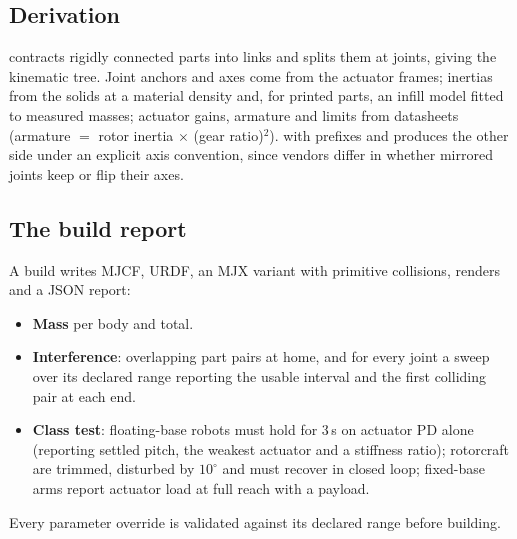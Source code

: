 \subsection{Derivation}
\label{sec:derive}
 contracts rigidly connected parts into links and splits them at joints, giving the
kinematic tree. Joint anchors and axes come from the actuator frames; inertias from the solids at a
material density and, for printed parts, an infill model fitted to measured masses; actuator gains,
armature and limits from datasheets (armature $=$ rotor inertia $\times$ (gear ratio)$^2$).
 with prefixes  and  produces the other side under an explicit axis convention,
since vendors differ in whether mirrored joints keep or flip their axes.

\subsection{The build report}
\label{sec:report}
A build writes MJCF, URDF, an MJX variant with primitive collisions, renders and a JSON report:
\begin{itemize}
\item \textbf{Mass} per body and total.
\item \textbf{Interference}: overlapping part pairs at home, and for every joint a sweep over its
  declared range reporting the usable interval and the first colliding pair at each end.
\item \textbf{Class test}: floating-base robots must hold  for 3\,s on actuator PD alone
  (reporting settled pitch, the weakest actuator and a stiffness ratio); rotorcraft are trimmed,
  disturbed by $10^\circ$ and must recover in closed loop; fixed-base arms report actuator load at
  full reach with a payload.
\end{itemize}
Every parameter override is validated against its declared range before building.
